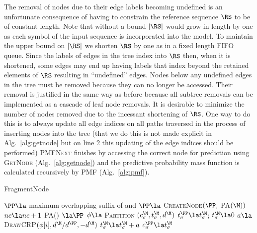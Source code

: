 The removal of nodes due to their edge labels becoming undefined is an unfortunate consequence of having to constrain the reference sequence $\RS$ to be of constant length.  Note that without a bound $|\RS|$ would grow in length by one as each symbol of the input sequence is incorporated into the model.  To maintain the upper bound on $|\RS|$ we shorten $\RS$ by one as in a fixed length FIFO queue. Since the labels of edges in the tree index into $\RS$ then, when it is shortened, some edges may end up having labels that index beyond the retained elements of $\RS$ resulting in ``undefined'' edges.  Nodes below any undefined edges in the tree must be removed because they can no longer be accessed.  Their removal is justified in the same way as before because all subtree removals can be implemented as a cascade of leaf node removals.  It is desirable to minimize the number of nodes removed due to the incessant shortening of $\RS$.  One way to do this is to always update all edge indices on all paths traversed in the process of inserting nodes into the tree (that we do this is not made explicit in Alg.~\ref{alg:getnode} but on line 2 this updating of the edge indices should be performed)   \textsc{PMFNext} finishes by accessing the correct node for prediction using \textsc{GetNode} (Alg.~\ref{alg:getnode}) and the predictive probability mass function is calculated recursively by \textsc{PMF} (Alg.~\ref{alg:pmf}).

\begin{algorithm}[t!]
	\caption{FragmentNode} \label{alg:fragmentnode}
	\begin{algorithmic}[1]

	
		\State $\PP \la$ maximum overlapping suffix  of \M \space and \Seq
		\State $\PP \la $ \textsc{CreateNode}$(\PP,$ \textsc{PA}$(\M))$
		\State $nc \la nc + 1$
		\State\textsc{ PA}(\M) $\la \PP$
		\For{$\sigma \in \Sigma$}
			\State $\phi \la$ \textsc{Partition} $(c^\M_\sigma, t^\M_\sigma,d^\M)$
			\State $t^\PP_\sigma \la t^\M_\sigma$;  $t^\M_\sigma \la 0$
				\State $a \la$ \textsc{DrawCRP}$(\phi[i],d^\M / d^\PP,-d^\M)$
				\State $t_\sigma^\M \la t_\sigma^\M + a$
			\EndFor
			\State $c^\PP_\sigma \la t^\M_\sigma$
		\EndFor
	\EndFunction
		\end{algorithmic}
\end{algorithm}

